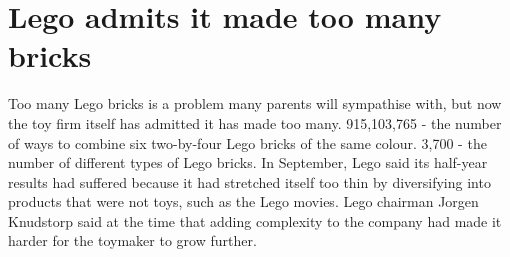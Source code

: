 \documentclass{article}
\begin{document}
            

\section{Lego admits it made too many bricks}
Too many Lego bricks is a problem many parents will sympathise with, but now the toy firm itself has admitted it has made too many. 915,103,765 - the number of ways to combine six two-by-four Lego bricks of the same colour. 3,700 - the number of different types of Lego bricks. In September, Lego said its half-year results had suffered because it had stretched itself too thin by diversifying into products that were not toys, such as the Lego movies. Lego chairman Jorgen Knudstorp said at the time that adding complexity to the company had made it harder for the toymaker to grow further.
\end{document}
